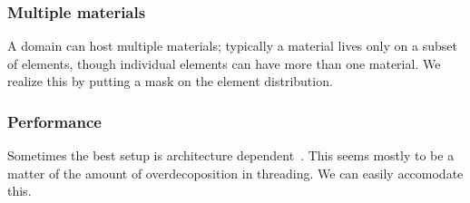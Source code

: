\documentclass[11pt,fleqn,preprint]{impreport}
\begin{document}
\subsubsection{Multiple materials}

A domain can host multiple materials; typically a material lives only
on a subset of elements, though individual elements can have more than
one material. We realize this by putting a mask on the element
distribution.

\subsubsection{Performance}

Sometimes the best setup is architecture
dependent~\cite{IPDPS13:LULESH}. This seems mostly to be a matter of
the amount of overdecoposition in threading. We can easily accomodate
this.

\begin{comment}
  
  Use of Liszt~\cite{DeVito:2011:Liszt} scales like MPI, but a good factor
  lower~\cite{IPDPS13:LULESH} (see slides).

  \section{Design}

  On variables are bundled per element in the reference code so that
  they can easier be passed through call trees. Should we use the $k$ parameter?

\section{Discussion}

\subsection{OpenMP}

Quoting from~\cite{IPDPS13:LULESH}:
\begin{quote}
  There are two places in LULESH where multiple threads can write data
  to the same node simultaneously. The resulting race conditions occur
  in the stress and hourglass routines where values are calculated on
  a per element basis and written to the nodes. To remove the race
  condition, all eight values computed for each node are placed in a
  temporary array as they are calculated and then a second loop sums
  the values to the nodes.
\end{quote}
That sort of thing is done automatically in IMP: the eight values from
the elements wind up in the beta object, and the summing to the nodes
happens in the local function.

\end{comment}



\end{document}
